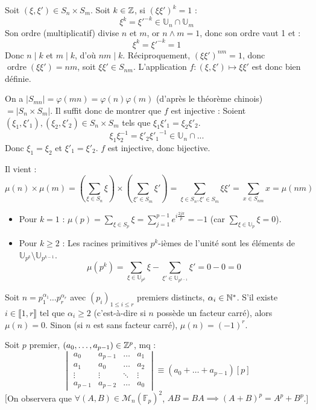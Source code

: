 \begin{solution}
Soit $(\xi, \xi') \in S_n \times S_m$. Soit $k \in \mathbb Z$, si $(\xi \xi')^k = 1$ :
\[ \xi^k = \xi'^{-k} \in \mathbb{U}_n \cap \mathbb{U}_m \]
Son ordre (multiplicatif) divise $n$ et $m$, or $n \wedge m = 1$, donc son ordre vaut 1 et :
\[ \xi^k = \xi'^{-k} = 1 \]
Donc $n \mid k$ et $m \mid k$, d'où $nm \mid k$.
Réciproquement, $(\xi \xi')^{nm} = 1$, donc $\operatorname{ordre}(\xi \xi') = nm$, soit $\xi \xi' \in S_{nm}$.
L'application $f : (\xi, \xi') \mapsto \xi \xi'$ est donc bien définie.

On a $|S_{mn}| = \varphi(mn) = \varphi(n)\varphi(m)$ (d'après le théorème chinois) $= |S_n \times S_m|$.
Il suffit donc de montrer que $f$ est injective :
Soient $(\xi_1, \xi'_1), (\xi_2, \xi'_2) \in S_n \times S_m$ tels que $\xi_1 \xi'_1 = \xi_2 \xi'_2$.
\[ \xi_1 \xi_2^{-1} = \xi'_2 {\xi'_1}^{-1} \in \mathbb{U}_n \cap \mathbb... \]
Donc $\xi_1 = \xi_2$ et $\xi'_1 = \xi'_2$.
$f$ est injective, donc bijective.

Il vient :
\[ \mu(n) \times \mu(m) = \left(\sum_{\xi \in S_n} \xi\right) \times \left(\sum_{\xi' \in S_m} \xi'\right) = \sum_{\xi \in S_n, \xi' \in S_m} \xi \xi' = \sum_{x \in S_{nm}} x = \mu(nm) \]

\begin{itemize}
  \item Pour $k=1$ : $\mu(p) = \sum_{\xi \in S_p} \xi = \sum_{j=1}^{p-1} e^{i \frac{2j\pi}{p}} = -1$ (car $\sum_{\xi \in \mathbb{U}_p} \xi = 0$).
  \item Pour $k \geq 2$ : Les racines primitives $p^k$-ièmes de l'unité sont les éléments de $\mathbb{U}_{p^k} \setminus \mathbb{U}_{p^{k-1}}$.
  \[ \mu(p^k) = \sum_{\xi \in \mathbb{U}_{p^k}} \xi - \sum_{\xi' \in \mathbb{U}_{p^{k-1}}} \xi' = 0 - 0 = 0 \]
\end{itemize}

Soit $n = p_1^{\alpha_1} \dots p_r^{\alpha_r}$ avec $(p_i)_{1 \leq i \leq r}$ premiers distincts, $\alpha_i \in \mathbb N^*$.
S'il existe $i \in \llbracket 1, r \rrbracket$ tel que $\alpha_i \geq 2$ (c'est-à-dire si $n$ possède un facteur carré), alors $\boxed{\mu(n) = 0}$.
Sinon (si $n$ est sans facteur carré), $\boxed{\mu(n) = (-1)^r}$.
\end{solution}


\begin{statementbox}
Soit $p$ premier, $(a_0, \dots, a_{p-1}) \in \mathbb Z^p$, mq :
\[
\begin{vmatrix}
a_0 & a_{p-1} & \dots & a_1 \\
a_1 & a_0 & \dots & a_2 \\
\vdots & \vdots & \ddots & \vdots \\
a_{p-1} & a_{p-2} & \dots & a_0
\end{vmatrix}
\equiv (a_0 + \dots + a_{p-1}) [p]
\]
$\big[$On observera que $\forall (A,B) \in \mathcal{M}_n(\mathbb{F}_p)^2$, $AB = BA \implies (A+B)^p = A^p + B^p$.\big]
\end{statementbox}

